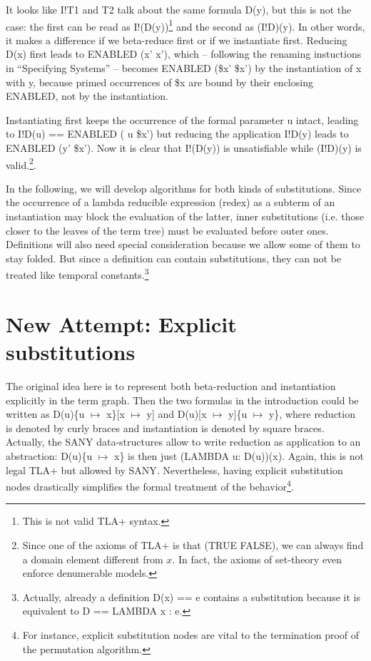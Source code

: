 \documentclass[a4paper]{article}
\newcommand{\tlaplus}[0]{{TLA+}}
\newcommand{\tla}[1]{#1}
\theoremstyle{definition}
\begin{document}
\vspace{2mm}
\noindent
It looks like \tla{I!T1} and \tla{T2} talk about the same formula \tla{D(y)},
but this is not the case: the first can be read as \tla{I!(D(y))}\footnote{This
  is not valid \tlaplus{} syntax.} and the second as \tla{(I!D)(y)}. In other
words, it makes a difference if we beta-reduce first or if we instantiate
first. Reducing D(x) first leads to \tla{ENABLED (x' \dif x')}, which --
following the renaming instuctions in ``Specifying Systems'' -- becomes
\tla{ENABLED (\$x' \dif \$x')} by the instantiation of \tla{x} with \tla{y},
because primed occurrences of \tla{\$x} are bound by their enclosing ENABLED,
not by the instantiation.

Instantiating first keeps the occurrence of the  formal parameter \tla{u} intact,
leading to \tla{I!D(u) == ENABLED ( u \dif \$x') } but reducing the application
\tla{I!D(y)} leads to \tla{ENABLED (y' \dif \$x')}. Now it is clear that
\tla{I!(D(y))} is unsatisfiable while \tla{(I!D)(y)} is valid.\footnote{ Since
  one of the axioms  of \tlaplus{} is that (TRUE \dif FALSE), we can always find
  a domain element different from $x$. In fact, the axioms of set-theory even
  enforce denumerable models.}.

In the following, we will develop algorithms for both kinds of substitutions.
Since the occurrence of a lambda reducible expression (redex) as a subterm of
an instantiation may block the evaluation of the latter, inner substitutions
(i.e. those closer to the leaves of the term tree) must be evaluated before
outer ones. Definitions will also need special consideration because
we allow some of them to stay folded. But since a definition can contain
substitutions, they can not be treated like temporal constants.\footnote{
  Actually, already a definition \tla{D(x) == e} contains a substitution
  because it is equivalent to D == LAMBDA x : e.
}

\section{New Attempt: Explicit substitutions}

The original idea here is to represent both beta-reduction and instantiation
explicitly in the term graph. Then the two formulas in the introduction
could be written as D(u)\{u $\mapsto$ x\}[x $\mapsto$ y] and
D(u)[x $\mapsto$ y]\{u $\mapsto$ y\}, where reduction is denoted by curly
braces and instantiation is denoted by square braces. Actually, the SANY
data-structures allow to write reduction as application to an abstraction:
D(u)\{u $\mapsto$ x\} is then just \tla{(LAMBDA u: D(u))(x)}. Again, this
is not legal \tlaplus{} but allowed by SANY. Nevertheless, having explicit
substitution nodes drastically simplifies the formal treatment of the
behavior\footnote{For instance, explicit substitution nodes are vital to the
  termination proof of the permutation algorithm.
}.
\end{document}
